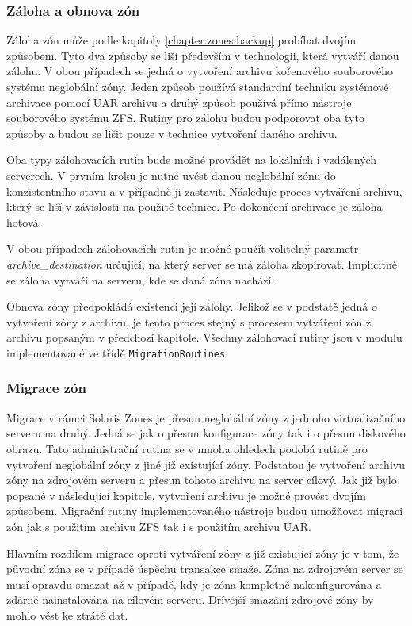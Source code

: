 \subsubsection{Záloha a obnova zón}
\label{chapter:implementation:szones:routines:backup}
Záloha zón může podle kapitoly \ref{chapter:zones:backup} probíhat dvojím způsobem. Tyto dva způsoby se liší především v technologii,
která vytváří danou zálohu. V obou případech se jedná o vytvoření archivu kořenového souborového systému neglobální zóny. Jeden
způsob používá standardní techniku systémové archivace pomocí UAR archivu a druhý způsob používá přímo nástroje souborového
systému ZFS. Rutiny pro zálohu budou podporovat oba tyto způsoby a budou se lišit pouze v technice vytvoření daného archivu.

Oba typy zálohovacích rutin bude možné provádět na lokálních i vzdálených serverech. V prvním kroku je nutné uvést danou neglobální
zónu do konzistentního stavu a v případně ji zastavit. Následuje proces vytváření archivu, který se liší v závislosti na
použité technice. Po dokončení archivace je záloha hotová. 

V obou případech zálohovacích rutin je možné použít volitelný parametr \textit{archive\_destination} určující, na který server 
se má záloha zkopírovat. Implicitně se záloha vytváří na serveru, kde se daná zóna nachází.

Obnova zóny předpokládá existenci její zálohy. Jelikož se v podstatě jedná o vytvoření zóny z archivu, je tento proces stejný s
procesem vytváření zón z archivu popsaným v předchozí kapitole. Všechny zálohovací rutiny jsou v modulu implementované ve třídě
\verb|MigrationRoutines|.
\subsubsection{Migrace zón}
\label{chapter:implementation:szones:routines:migration}
Migrace v rámci Solaris Zones je přesun neglobální zóny z jednoho virtualizačního serveru na druhý. Jedná se jak o přesun
konfigurace zóny tak i o přesun diskového obrazu. Tato administrační rutina se v mnoha ohledech podobá rutině pro vytvoření
neglobální zóny z jiné již existující zóny. Podstatou je vytvoření archivu zóny na zdrojovém serveru a přesun tohoto archivu
na server cílový. Jak již bylo popsané v následující kapitole, vytvoření archivu je možné provést dvojím způsobem. Migrační rutiny
implementovaného nástroje budou umožňovat migraci zón jak s použitím archivu ZFS tak i s použitím archivu UAR.

Hlavním rozdílem migrace oproti vytváření zóny z již existující zóny je v tom, že původní zóna se v případě úspěchu transakce smaže.
Zóna na zdrojovém server se musí opravdu smazat až v případě, kdy je zóna kompletně nakonfigurována a zdárně nainstalována na
cílovém serveru. Dřívější smazání zdrojové zóny by mohlo vést ke ztrátě dat.

